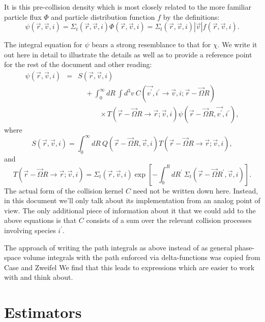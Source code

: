 \documentclass[12pt]{report}
\begin{document}
It is this pre-collision density which is most closely related to the 
more familiar particle flux $\Phi$ and particle
distribution function $f$ by the definitions:
\begin{equation}
\psi(\vec{r},\vec{v},i) = \Sigma_{t}(\vec{r},\vec{v},i) \Phi(\vec{r},\vec{v},i)
 = \Sigma_{t}(\vec{r},\vec{v},i) |\vec{v}| f(\vec{r},\vec{v},i).
\end{equation}

The integral equation for $\psi$ bears a strong resemblance to that for
$\chi$. We write it out here in detail to illustrate the details as well as 
to provide a reference point for the rest of the document and other
reading:
\begin{eqnarray}
\psi(\vec{r},\vec{v},i) & = & S(\vec{r},\vec{v},i) \nonumber \\
& & \quad + \int_{0}^{\infty} dR \:
\int d^{3}v \: 
C(\vec{v^{\prime}},i^{\prime} \rightarrow \vec{v},i; \vec{r} - \vec{\Omega} R) 
\nonumber \\
& & \qquad \quad \times T(\vec{r} - \vec{\Omega} R \rightarrow \vec{r}; \vec{v},i)
\psi(\vec{r} - \vec{\Omega} R, \vec{v^{\prime}},i^{\prime}),
\end{eqnarray}
where
\begin{equation}
S(\vec{r},\vec{v},i) = \int_{0}^{\infty} dR \: 
Q(\vec{r} - \vec{\Omega} R, \vec{v}, i)
T(\vec{r} - \vec{\Omega} R \rightarrow \vec{r}; \vec{v},i),
\end{equation}
and
\begin{equation}
T(\vec{r} - \vec{\Omega} R \rightarrow \vec{r}; \vec{v},i)
= \Sigma_{t}(\vec{r},\vec{v},i) \exp \left[ - \int_{0}^{R} dR^{\prime} \:
\Sigma_{t}(\vec{r} - \vec{\Omega} R^{\prime},\vec{v},i) \right].
\end{equation}
The actual form of the collision kernel $C$ need not be written down
here. Instead, in this document we'll only talk about its implementation
from an analog point of view. The only additional piece of information
about it that we could add to the above equations is that $C$ consists
of a sum over the relevant collision processes involving species $i^{\prime}$.

The approach of writing the path integrals as above instead of as general
phase-space volume integrals with the path enforced via 
delta-functions\cite{Reit92}
was copied from Case and Zweifel\cite{Case67}
We find that this leads to expressions which are easier to work
with and think about.

\section{Estimators}
\label{Estimators}
\end{document}
